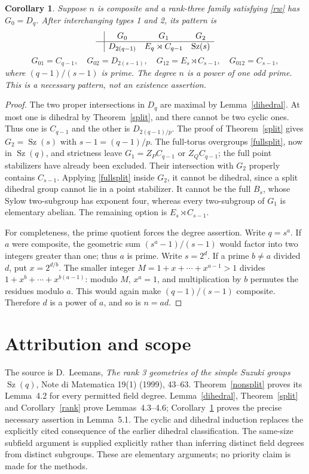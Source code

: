 \documentclass[11pt,a4paper]{article}
\newtheorem{corollary}[lemma]{Corollary}
\newcommand{\Sz}{\operatorname{Sz}}
\begin{document}
\begin{corollary}\label{shape}
Suppose $n$ is composite and a rank-three family satisfying \eqref{rw}
has $G_0=D_q$. After interchanging types 1 and 2, its pattern is
\[
\begin{array}{c|ccc}
 &G_0&G_1&G_2\\\hline
 &D_{2(q-1)}&E_q\rtimes C_{q-1}&\Sz(s)
\end{array}
\]
\[
 G_{01}=C_{q-1},\quad G_{02}=D_{2(s-1)},\quad
 G_{12}=E_s\rtimes C_{s-1},\quad G_{012}=C_{s-1},
\]
where $(q-1)/(s-1)$ is prime. The degree $n$ is a power of one
odd prime. This is a necessary pattern, not an existence assertion.
\end{corollary}
\begin{proof}
The two proper intersections in $D_q$ are maximal by
Lemma~\ref{dihedral}. At most one is dihedral by Theorem~\ref{split},
and there cannot be two cyclic ones. Thus one is $C_{q-1}$ and the
other is $D_{2(q-1)/p}$. The proof of Theorem~\ref{split} gives
$G_2=\Sz(s)$ with $s-1=(q-1)/p$.
The full-torus overgroups \eqref{fullsplit}, now in $\Sz(q)$, and
strictness leave $G_1=Z_P C_{q-1}$ or $Z_Q C_{q-1}$; the full
point stabilizers have already been excluded. Their intersection with
$G_2$ properly contains $C_{s-1}$. Applying \eqref{fullsplit} inside
$G_2$, it cannot be dihedral, since a split dihedral group cannot lie
in a point stabilizer. It cannot be the full $B_s$, whose Sylow
two-subgroup has exponent four, whereas every two-subgroup of $G_1$
is elementary abelian. The remaining option is $E_s\rtimes C_{s-1}$.

For completeness, the prime quotient forces the degree assertion.
Write $q=s^a$. If $a$ were composite, the geometric sum
$(s^a-1)/(s-1)$ would factor into two integers greater than one;
thus $a$ is prime. Write $s=2^d$. If a prime $b\ne a$ divided $d$,
put $x=2^{d/b}$. The smaller integer
$M=1+x+\cdots+x^{a-1}>1$ divides
$1+x^b+\cdots+x^{b(a-1)}$: modulo $M$, $x^a=1$, and multiplication
by $b$ permutes the residues modulo $a$. This would again make
$(q-1)/(s-1)$ composite. Therefore $d$ is a power of $a$, and so
is $n=ad$.
\end{proof}

\section{Attribution and scope}
The source is D.~Leemans, \emph{The rank 3 geometries of the simple
Suzuki groups $\Sz(q)$}, Note di Matematica 19(1) (1999), 43--63.
Theorem~\ref{nonsplit} proves its Lemma~4.2 for every permitted field
degree. Lemma~\ref{dihedral}, Theorem~\ref{split} and
Corollary~\ref{rank} prove Lemmas~4.3--4.6; Corollary~\ref{shape}
proves the precise necessary assertion in Lemma~5.1.
The cyclic and dihedral induction replaces the explicitly cited
consequence of the earlier dihedral classification. The same-size
subfield argument is supplied explicitly rather than inferring distinct
field degrees from distinct subgroups. These are elementary arguments;
no priority claim is made for the methods.
\end{document}
